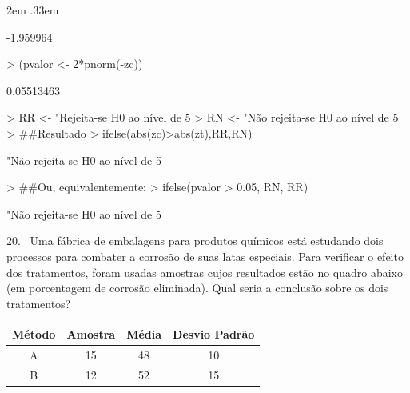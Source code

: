 \documentclass{article}
\newenvironment{ManualExercise}
  {\begin{list}{}{\leftmargin \QuestionIndent
    \partopsep0pt \parsep\parskip \topsep\QuestionBefore
    \itemsep\QuestionBefore \labelwidth2em
    \labelsep.33em
    \usecounter{Question}}}
  {\end{list}}
\begin{document}
\begin{Exercise}
\begin{ManualExercise}
\begin{Schunk}
\begin{Soutput}
[1] -1.959964
\end{Soutput}
\begin{Sinput}
> (pvalor <- 2*pnorm(-zc))
\end{Sinput}
\begin{Soutput}
[1] 0.05513463
\end{Soutput}
\begin{Sinput}
> RR <- "Rejeita-se H0 ao nível de 5%
> RN <- "Não rejeita-se H0 ao nível de 5%
> ##Resultado
> ifelse(abs(zc)>abs(zt),RR,RN)
\end{Sinput}
\begin{Soutput}
[1] "Não rejeita-se H0 ao nível de 5%
\end{Soutput}
\begin{Sinput}
> ##Ou, equivalentemente:
> ifelse(pvalor > 0.05, RN, RR)
\end{Sinput}
\begin{Soutput}
[1] "Não rejeita-se H0 ao nível de 5%
\end{Soutput}
\end{Schunk}

\item[20.~]Uma fábrica de embalagens para produtos químicos está estudando dois processos para combater a corrosão de suas latas especiais. Para verificar o efeito dos tratamentos, foram usadas amostras cujos resultados estão no quadro abaixo (em porcentagem de corrosão eliminada). Qual seria a conclusão sobre os dois tratamentos?

\begin{tabular}{cccc}\\ \hline
Método & Amostra & Média & Desvio Padrão \\ \hline
A & 15 & 48 & 10 \\
B & 12 & 52 & 15 \\ \hline
\end{tabular}


\end{ManualExercise}
\end{Exercise}
\end{document}
